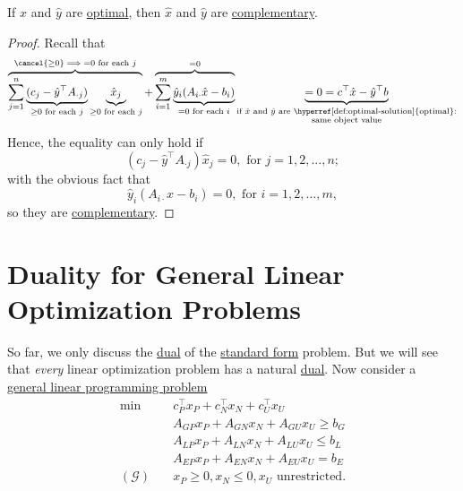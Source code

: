 \begin{theorem}\label{thm:strong-complementary-slackness-theorem}
	If \(\hat{x}\) and \(\hat{y}\) are \hyperref[def:optimal-solution]{optimal}, then \(\hat{x}\) and \(\hat{y}\) are \hyperref[def:complementary]{complementary}.
\end{theorem}
\begin{proof}
	Recall that
	\[
		\overbrace{\sum\limits_{j=1}^{n} \underbrace{(c_{j}-\hat{y}^{\top}A_{\cdot j})}_{ \geq 0\text{ for each }j}\underbrace{\hat{x}_{j}}_{\geq 0 \text{ for each }j}}^{\cancel{\geq 0}\implies = 0\text{ for each }j}
		+ \overbrace{\sum\limits_{i=1}^{m} \underbrace{\hat{y}_i(A_{i\cdot}\hat{x} - b_{i})}_{ = 0\text{ for each }i}}^{=0}
		\underbrace{= 0 = c^{\top}\hat{x} - \hat{y}^{\top}b}_{\substack{\text{if }\hat{x}\text{ and }\hat{y}\text{ are \hyperref[def:optimal-solution]{optimal}:}\\ \text{same object value}}}
	\]
	Hence, the equality can only hold if
	\[
		(c_{j} - \hat{y}^{\top}A_{\cdot j})\hat{x}_j = 0, \text{ for }j = 1, 2, \dots , n;
	\]
	with the obvious fact that
	\[
		\hat{y}_i(A_{i\cdot}\hat{x} - b_{i}) = 0, \text{ for }i = 1, 2, \dots , m,
	\]
	so they are \hyperref[def:complementary]{complementary}.
\end{proof}

\section{Duality for General Linear Optimization Problems}
So far, we only discuss the \hyperref[def:dual]{dual} of the \hyperref[def:standard-form]{standard form} problem. But we will see that \emph{every} linear optimization problem has a natural \hyperref[def:dual]{dual}. Now consider a \hyperref[def:general-linear-programming-problem]{general linear programming problem}
\[
	\begin{aligned}
		\min~              & c^{\top}_P x_P + c^{\top}_N x_N + c^{\top}_U x_U \\
		                   & A_{GP}x_P +A_{GN}x_N + A_{GU}x_U\geq b_G         \\
		                   & A_{LP}x_P +A_{LN}x_N + A_{LU}x_U \leq b_L        \\
		                   & A_{EP}x_P +A_{EN}x_N + A_{EU}x_U = b_E           \\
		(\mathcal{G})\quad & x_P\geq 0, x_N \leq 0, x_U \text{ unrestricted}.
	\end{aligned}
\]

